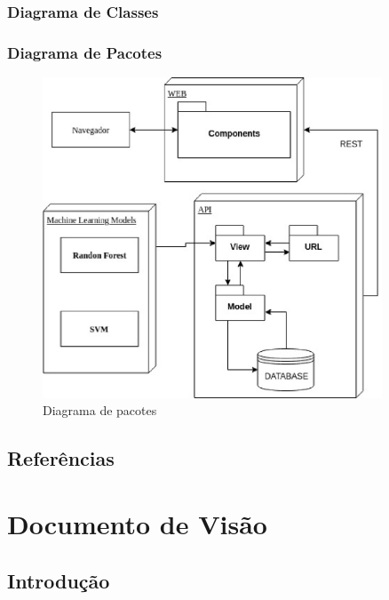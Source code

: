 \begin{anexosenv}
	\subsection{Diagrama de Classes}
	\subsection{Diagrama de Pacotes}
	\begin{figure}[!htb]
		\centering
		\includegraphics[width=0.9\textwidth]{figuras/diagrama_pacotes.eps}
		\caption{Diagrama de pacotes}
		\label{diagramadepacotes}
	\end{figure}

	\section{Referências}


	\chapter[Documento de Visão]{Documento de Visão}
	\label{adocvisao}

	\section{Introdução}


\end{anexosenv}

